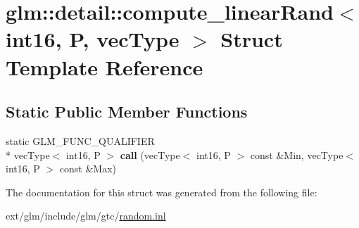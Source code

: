 \hypertarget{structglm_1_1detail_1_1compute__linear_rand_3_01int16_00_01_p_00_01vec_type_01_4}{\section{glm\-:\-:detail\-:\-:compute\-\_\-linear\-Rand$<$ int16, P, vec\-Type $>$ Struct Template Reference}
\label{structglm_1_1detail_1_1compute__linear_rand_3_01int16_00_01_p_00_01vec_type_01_4}
}
\subsection*{Static Public Member Functions}
\begin{DoxyCompactItemize}
\item 
\hypertarget{structglm_1_1detail_1_1compute__linear_rand_3_01int16_00_01_p_00_01vec_type_01_4_a2cf2a727838709537e66cef0fe48b236}{static G\-L\-M\-\_\-\-F\-U\-N\-C\-\_\-\-Q\-U\-A\-L\-I\-F\-I\-E\-R \\*
vec\-Type$<$ int16, P $>$ {\bfseries call} (vec\-Type$<$ int16, P $>$ const \&Min, vec\-Type$<$ int16, P $>$ const \&Max)}\label{structglm_1_1detail_1_1compute__linear_rand_3_01int16_00_01_p_00_01vec_type_01_4_a2cf2a727838709537e66cef0fe48b236}

\end{DoxyCompactItemize}


The documentation for this struct was generated from the following file\-:\begin{DoxyCompactItemize}
\item 
ext/glm/include/glm/gtc/\hyperlink{random_8inl}{random.\-inl}\end{DoxyCompactItemize}
